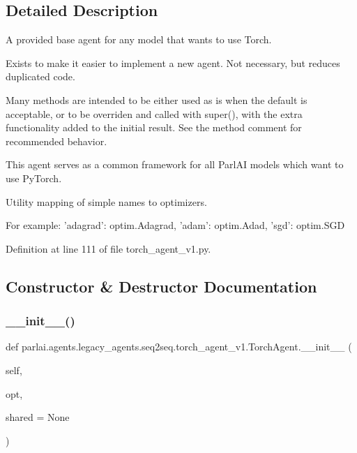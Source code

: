 \subsection{Detailed Description}
\begin{DoxyVerb}A provided base agent for any model that wants to use Torch.

Exists to make it easier to implement a new agent.
Not necessary, but reduces duplicated code.

Many methods are intended to be either used as is when the default is
acceptable, or to be overriden and called with super(), with the extra
functionality added to the initial result. See the method comment for
recommended behavior.

This agent serves as a common framework for all ParlAI models which want
to use PyTorch.
\end{DoxyVerb}
\begin{DoxyVerb}Utility mapping of simple names to optimizers.

For example:
'adagrad': optim.Adagrad, 'adam': optim.Adad, 'sgd': optim.SGD
\end{DoxyVerb}
 

Definition at line 111 of file torch\+\_\+agent\+\_\+v1.\+py.



\subsection{Constructor \& Destructor Documentation}
\mbox{\label{classparlai_1_1agents_1_1legacy__agents_1_1seq2seq_1_1torch__agent__v1_1_1TorchAgent_a1c4eb91757ee23e75edfa957d05db338}} 
\subsubsection{\texorpdfstring{\+\_\+\+\_\+init\+\_\+\+\_\+()}{\_\_init\_\_()}}
{\footnotesize\ttfamily def parlai.\+agents.\+legacy\+\_\+agents.\+seq2seq.\+torch\+\_\+agent\+\_\+v1.\+Torch\+Agent.\+\_\+\+\_\+init\+\_\+\+\_\+ (\begin{DoxyParamCaption}\item[{}]{self,  }\item[{}]{opt,  }\item[{}]{shared = {\ttfamily None} }\end{DoxyParamCaption})}

